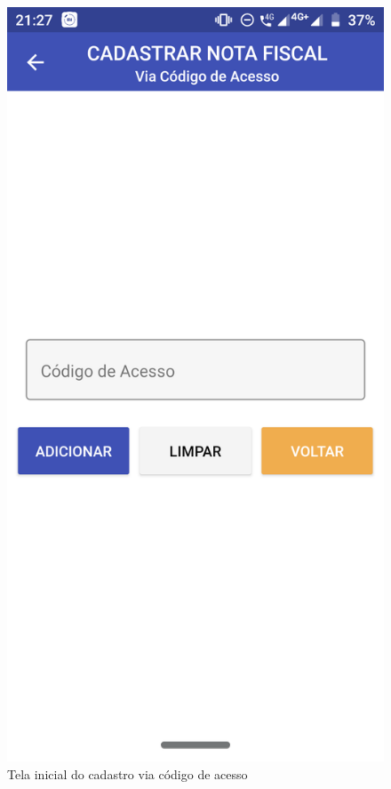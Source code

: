 \newpage
\begin{figure}[h]
    \centering
    \includegraphics[scale=0.15]{tcc/figures/app/app_codigo_acesso.png}
    \caption{Tela inicial do cadastro via código de acesso}
    \label{appCodigoAcessoInicialFig}
\end{figure}

